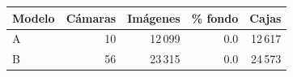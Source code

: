 \begin{tabular}{lrrrr}
\toprule
Modelo & Cámaras & Imágenes & \% fondo & Cajas \\
\midrule
A & 10 & 12\,099 & 0.0 & 12\,617 \\
B & 56 & 23\,315 & 0.0 & 24\,573 \\
\bottomrule
\end{tabular}
